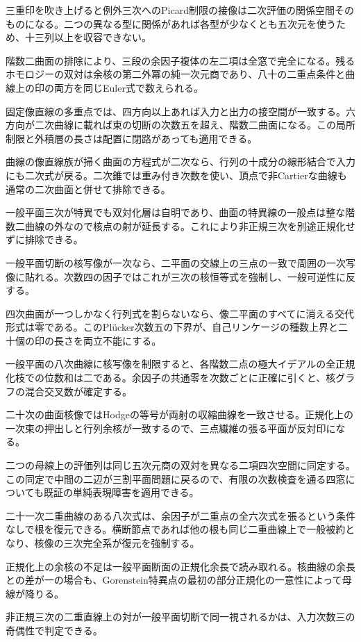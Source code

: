 \documentclass[11pt,a4paper]{ltjsarticle}
\begin{document}
三重印を吹き上げると例外三次へのPicard制限の接像は二次評価の関係空間そのものになる。二つの異なる型に関係があれば各型が少なくとも五次元を使うため、十三列以上を収容できない。

階数二曲面の排除により、三段の余因子複体の左二項は全窓で完全になる。残るホモロジーの双対は余核の第二外冪の純一次元商であり、八十の二重点条件と曲線上の印の両方を同じEuler式で数えられる。

固定像直線の多重点では、四方向以上あれば入力と出力の接空間が一致する。六方向が二次曲線に載れば束の切断の次数五を超え、階数二曲面になる。この局所制限と外積層の長さは配置に閉路があっても適用できる。

曲線の像直線族が掃く曲面の方程式が二次なら、行列の十成分の線形結合で入力にも二次式が戻る。二次錐では重み付き次数を使い、頂点で非Cartierな曲線も通常の二次曲面と併せて排除できる。

一般平面三次が特異でも双対化層は自明であり、曲面の特異線の一般点は整な階数二曲線の外なので核点の射が延長する。これにより非正規三次を別途正規化せずに排除できる。

一般平面切断の核写像が一次なら、二平面の交線上の三点の一致で周囲の一次写像に貼れる。次数四の因子ではこれが三次の核恒等式を強制し、一般可逆性に反する。

四次曲面が一つしかなく行列式を割らないなら、像二平面のすべてに消える交代形式は零である。このPlücker次数五の下界が、自己リンケージの種数上界と二十個の印の長さを両立不能にする。

一般平面の八次曲線に核写像を制限すると、各階数二点の極大イデアルの全正規化枝での位数和は二である。余因子の共通零を次数ごとに正確に引くと、核グラフの混合交叉数が確定する。

二十次の曲面核像ではHodgeの等号が両射の収縮曲線を一致させる。正規化上の一次束の押出しと行列余核が一致するので、三点繊維の張る平面が反対印になる。

二つの母線上の評価列は同じ五次元商の双対を異なる二項四次空間に同定する。この同定で中間の二辺が三割平面問題に戻るので、有限の次数検査を通る四窓についても既証の単純表現障害を適用できる。

二十一次二重曲線のある八次式は、余因子が二重点の全六次式を張るという条件なしで根を復元できる。横断節点であれば他の根も同じ二重曲線上で一般被約となり、核像の三次完全系が復元を強制する。

正規化上の余核の不足は一般平面断面の正規化余長で読み取れる。核曲線の余長との差が一の場合も、Gorenstein特異点の最初の部分正規化の一意性によって母線が降りる。

非正規三次の二重直線上の対が一般平面切断で同一視されるかは、入力次数三の奇偶性で判定できる。
\end{document}
